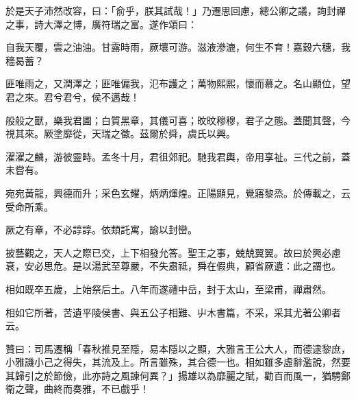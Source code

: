 \begin{pinyinscope}
於是天子沛然改容，曰：「俞乎，朕其試哉！」乃遷思回慮，總公卿之議，詢封禪之事，詩大澤之博，廣符瑞之富。遂作頌曰：

自我天覆，雲之油油。甘露時雨，厥壤可游。滋液滲漉，何生不育！嘉穀六穗，我穡曷蓄？

匪唯雨之，又潤澤之；匪唯偏我，氾布護之；萬物熙熙，懷而慕之。名山顯位，望君之來。君兮君兮，侯不邁哉！

般般之獸，樂我君圃；白質黑章，其儀可喜；旼旼穆穆，君子之態。蓋聞其聲，今視其來。厥塗靡從，天瑞之徵。茲爾於舜，虞氏以興。

濯濯之麟，游彼靈畤。孟冬十月，君徂郊祀。馳我君輿，帝用享祉。三代之前，蓋未嘗有。

宛宛黃龍，興德而升；采色玄耀，炳炳煇煌。正陽顯見，覺寤黎烝。於傳載之，云受命所乘。

厥之有章，不必諄諄。依類託寓，諭以封巒。

披藝觀之，天人之際已交，上下相發允答。聖王之事，兢兢翼翼。故曰於興必慮衰，安必思危。是以湯武至尊嚴，不失肅祗，舜在假典，顧省厥遺：此之謂也。

相如既卒五歲，上始祭后土。八年而遂禮中岳，封于太山，至梁甫，禪肅然。

相如它所著，苦遺平陵侯書、與五公子相難、屮木書篇，不采，采其尤著公卿者云。

贊曰：司馬遷稱「春秋推見至隱，易本隱以之顯，大雅言王公大人，而德逮黎庶，小雅譏小己之得失，其流及上。所言雖殊，其合德一也。相如雖多虛辭濫說，然要其歸引之於節儉，此亦詩之風諫何異？」揚雄以為靡麗之賦，勸百而風一，猶騁鄭衛之聲，曲終而奏雅，不已戲乎！


\end{pinyinscope}